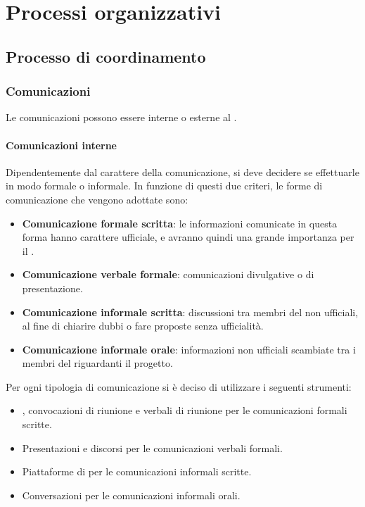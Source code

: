 \section{Processi organizzativi}
\subsection{Processo di coordinamento}
\subsubsection{Comunicazioni}
Le comunicazioni possono essere interne o esterne al .

\paragraph{Comunicazioni interne}
Dipendentemente dal carattere della comunicazione, si deve decidere se effettuarle in modo formale o informale.
In funzione di questi due criteri, le forme di comunicazione che vengono adottate sono:
\begin{itemize}
	\item \textbf{Comunicazione formale scritta}: le informazioni comunicate in questa forma hanno carattere ufficiale, e avranno quindi una grande importanza per il .
	\item \textbf{Comunicazione verbale formale}: comunicazioni divulgative o di presentazione.
	\item \textbf{Comunicazione informale scritta}: discussioni tra membri del  non ufficiali, al fine di chiarire dubbi o fare proposte senza ufficialità.
	\item \textbf{Comunicazione informale orale}: informazioni non ufficiali scambiate tra i membri del  riguardanti il progetto.
\end{itemize}

Per ogni tipologia di comunicazione si è deciso di utilizzare i seguenti strumenti:
\begin{itemize}
	\item \textit{\PdP}, convocazioni di riunione e verbali di riunione per le comunicazioni formali scritte.
	\item Presentazioni e discorsi per le comunicazioni verbali formali.
	\item Piattaforme di  per le comunicazioni informali scritte.
	\item Conversazioni per le comunicazioni informali orali.
\end{itemize}

